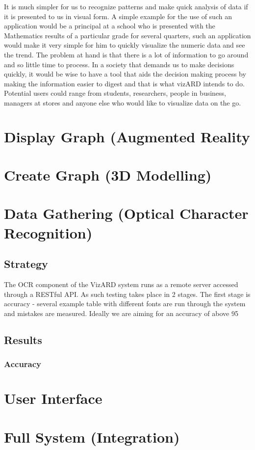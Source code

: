 \documentclass[a4paper,12pt]{article}
\begin{document}
It is much simpler for us to recognize patterns and make quick analysis of data if it is presented to us in visual form. A simple example for the use of such an application would be a principal at a school who is presented with the Mathematics results of a particular grade for several quarters, such an application would make it very simple for him to quickly visualize the numeric data and see the trend.
\newline
\newline
The problem at hand is that there is a lot of information to go around and so little time to process. In a society that demands us to make decisions quickly, it would be wise to have a tool that aids the decision making process by making the information easier to digest and that is what vizARD intends to do.
\newline
\newline
Potential users could range from students, researchers, people in business, managers at stores and anyone else who would like to visualize data on the go.
		
\newpage
\section{Display Graph (Augmented Reality}

\section{Create Graph (3D Modelling)}

\section{Data Gathering (Optical Character Recognition)}
	\subsection{Strategy} The OCR component of the VizARD system runs as a remote server accessed through a RESTful API. As such testing takes place in 2 stages. The first stage is accuracy - several example table with different fonts are run through the system and mistakes are measured. Ideally we are aiming for an accuracy of above 95%
	
	\subsection{Results}
	\subsubsection{Accuracy}

\section{User Interface}

\section{Full System (Integration)}
\end{document}
